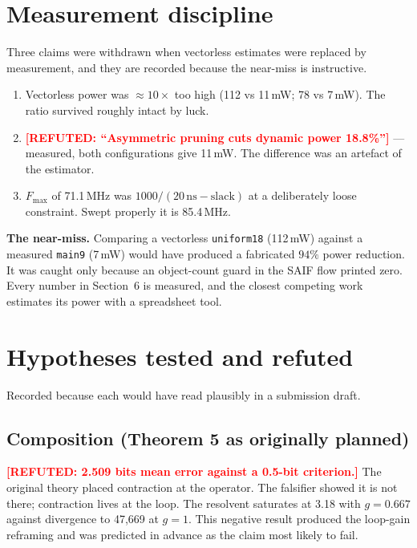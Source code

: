 \documentclass[11pt,a4paper]{article}
\newcommand{\refuted}[1]{\textcolor{red}{\textbf{[REFUTED: #1]}}}
\begin{document}
\section{Measurement discipline}

Three claims were withdrawn when vectorless estimates were replaced by
measurement, and they are recorded because the near-miss is instructive.

\begin{enumerate}
\item Vectorless power was $\approx 10\times$ too high (112 vs 11\,mW;
      78 vs 7\,mW). The ratio survived roughly intact by luck.
\item \refuted{``Asymmetric pruning cuts dynamic power 18.8\%''} --- measured,
      both configurations give 11\,mW. The difference was an artefact of the
      estimator.
\item $F_{\max}$ of 71.1\,MHz was $1000/(20\,\text{ns} - \text{slack})$ at a
      deliberately loose constraint. Swept properly it is 85.4\,MHz.
\end{enumerate}

\textbf{The near-miss.} Comparing a vectorless \texttt{uniform18} (112\,mW)
against a measured \texttt{main9} (7\,mW) would have produced a fabricated
$94\%$ power reduction. It was caught only because an object-count guard in the
SAIF flow printed zero. Every number in Section~6 is measured, and the closest
competing work estimates its power with a spreadsheet tool.

\section{Hypotheses tested and refuted}

Recorded because each would have read plausibly in a submission draft.

\subsection{Composition (Theorem 5 as originally planned)}
\refuted{2.509 bits mean error against a 0.5-bit criterion.} The original
theory placed contraction at the operator. The falsifier showed it is not
there; contraction lives at the loop. The resolvent saturates at 3.18 with
$g = 0.667$ against divergence to 47{,}669 at $g = 1$. This negative result
produced the loop-gain reframing and was predicted in advance as the claim most
likely to fail.
\end{document}
